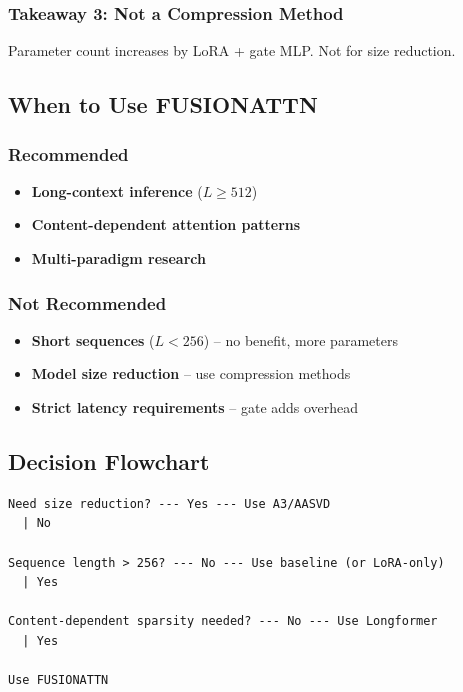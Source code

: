 \subsubsection{Takeaway 3: Not a Compression Method}

Parameter count increases by LoRA + gate MLP. Not for size reduction.

\subsection{When to Use FUSIONATTN}

\subsubsection{Recommended}

\begin{itemize}
\item \textbf{Long-context inference} ($L \geq 512$)
\item \textbf{Content-dependent attention patterns}
\item \textbf{Multi-paradigm research}

\end{itemize}
\subsubsection{Not Recommended}

\begin{itemize}
\item \textbf{Short sequences} ($L < 256$) -- no benefit, more parameters
\item \textbf{Model size reduction} -- use compression methods
\item \textbf{Strict latency requirements} -- gate adds overhead

\end{itemize}
\subsection{Decision Flowchart}

\begin{lstlisting}
Need size reduction? --- Yes --- Use A3/AASVD
  | No
   
Sequence length > 256? --- No --- Use baseline (or LoRA-only)
  | Yes
   
Content-dependent sparsity needed? --- No --- Use Longformer
  | Yes
   
Use FUSIONATTN
\end{lstlisting}

